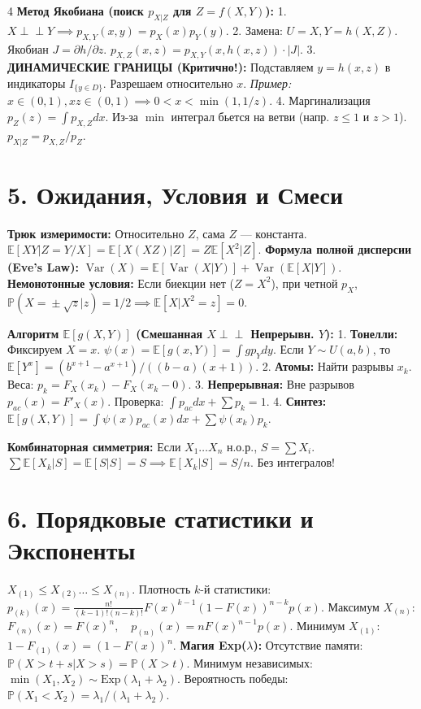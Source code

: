 \documentclass[8pt, a4paper, landscape]{extarticle}
\newcommand{\E}{\mathbb{E}}
\renewcommand{\P}{\mathbb{P}}
\DeclareMathOperator{\Var}{Var}
\begin{document}
\begin{multicols*}{4}
\textbf{Метод Якобиана (поиск $p_{X|Z}$ для $Z=f(X,Y)$):}
1. $X \perp\!\!\perp Y \implies p_{X,Y}(x,y) = p_X(x)p_Y(y)$.
2. Замена: $U=X, Y=h(X,Z)$. Якобиан $J = \partial h / \partial z$.
$p_{X,Z}(x,z) = p_{X,Y}(x, h(x,z)) \cdot |J|$.
3. \textbf{ДИНАМИЧЕСКИЕ ГРАНИЦЫ (Критично!):} Подставляем $y=h(x,z)$ в индикаторы $I_{\{y \in D\}}$. Разрешаем относительно $x$.
\textit{Пример:} $x \in (0,1), xz \in (0,1) \implies 0 < x < \min(1, 1/z)$.
4. Маргинализация $p_Z(z) \!=\! \int p_{X,Z} dx$. Из-за $\min$ интеграл бьется на ветви (напр. $z \le 1$ и $z > 1$). $p_{X|Z} = p_{X,Z}/p_Z$.

\section*{5. Ожидания, Условия и Смеси}
\textbf{Трюк измеримости:} Относительно $Z$, сама $Z$ — константа.
$\E[XY | Z\!=\!Y/X] = \E[X(XZ)|Z] = Z\E[X^2|Z]$.
\textbf{Формула полной дисперсии (Eve's Law):}
$\Var(X) = \E[\Var(X|Y)] + \Var(\E[X|Y])$.
\textbf{Немонотонные условия:} Если биекции нет ($Z=X^2$), при четной $p_X$, $\P(X\!=\!\pm\sqrt{z}|z) \!=\! 1/2 \implies \E[X|X^2\!=\!z] \!=\! 0$.

\textbf{Алгоритм $\E[g(X,Y)]$ (Смешанная $X \perp\!\!\perp$ Непрерывн. $Y$):}
1. \textbf{Тонелли:} Фиксируем $X=x$. $\psi(x) = \E[g(x,Y)] = \int g p_Y dy$.
Если $Y \!\sim\! U(a,b)$, то $\E[Y^x] = (b^{x+1}\!-\!a^{x+1})/((b\!-\!a)(x\!+\!1))$.
2. \textbf{Атомы:} Найти разрывы $x_k$. Веса: $p_k = F_X(x_k) \!-\! F_X(x_k-0)$.
3. \textbf{Непрерывная:} Вне разрывов $p_{ac}(x) = F'_X(x)$. Проверка: $\int p_{ac}dx + \sum p_k = 1$.
4. \textbf{Синтез:} $\E[g(X,Y)] \!=\! \int \psi(x) p_{ac}(x) dx \!+\! \sum \psi(x_k) p_k$.

\textbf{Комбинаторная симметрия:} Если $X_1 \dots X_n$ н.о.р., $S = \sum X_i$.
$\sum \E[X_k|S] = \E[S|S] = S \implies \E[X_k|S] = S/n$. Без интегралов!

\section*{6. Порядковые статистики и Экспоненты}
$X_{(1)} \le X_{(2)} \dots \le X_{(n)}$. Плотность $k$-й статистики:
$p_{(k)}(x) = \frac{n!}{(k-1)!(n-k)!} F(x)^{k-1} (1-F(x))^{n-k} p(x)$.
Максимум $X_{(n)}$: $F_{(n)}(x) = F(x)^n, \quad p_{(n)}(x) = n F(x)^{n-1}p(x)$.
Минимум $X_{(1)}$: $1 - F_{(1)}(x) = (1-F(x))^n$.
\textbf{Магия Exp($\lambda$):} Отсутствие памяти: $\P(X \!>\! t\!+\!s | X \!>\! s) \!=\! \P(X \!>\! t)$.
Минимум независимых: $\min(X_1, X_2) \sim \text{Exp}(\lambda_1+\lambda_2)$.
Вероятность победы: $\P(X_1 < X_2) = \lambda_1/(\lambda_1+\lambda_2)$.


\end{multicols*}
\end{document}
